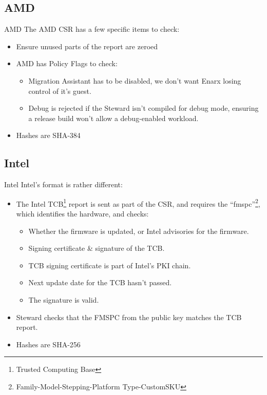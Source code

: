 \documentclass[graphics]{beamer}
\begin{document}
\subsection{AMD}
\begin{frame}{AMD}
The AMD CSR has a few specific items to check:
\begin{itemize}
    \item Ensure unused parts of the report are zeroed
    \item AMD has Policy Flags to check:
    \begin{itemize}
        \item Migration Assistant has to be disabled, we don't want Enarx losing control of it's guest.
        \item Debug is rejected if the Steward isn't compiled for debug mode, ensuring a release build won't allow a debug-enabled workload.
    \end{itemize}
    \item Hashes are SHA-384
\end{itemize}
\end{frame}

\subsection{Intel}
\begin{frame}{Intel}
Intel's format is rather different:
\begin{itemize}
    \item The Intel TCB\footnote{Trusted Computing Base} report is sent as part of the CSR, and requires the ``fmspc''\footnote{Family-Model-Stepping-Platform Type-CustomSKU}, which identifies the hardware, and checks:
    \begin{itemize}
        \item Whether the firmware is updated, or Intel advisories for the firmware.
        \item Signing certificate \& signature of the TCB.
        \item TCB signing certificate is part of Intel's PKI chain.
        \item Next update date for the TCB hasn't passed.
        \item The signature is valid.
    \end{itemize}
    \item Steward checks that the FMSPC from the public key matches the TCB report.
    \item Hashes are SHA-256
\end{itemize}
\end{frame}
\end{document}
